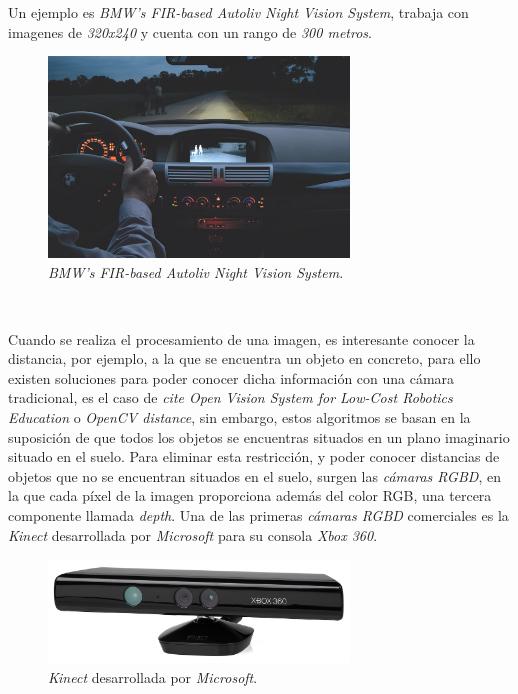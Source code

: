 Un ejemplo es \textit{BMW's FIR-based Autoliv Night Vision System}, trabaja con imagenes de \textit{320x240} y cuenta con un rango de \textit{300 metros}.\\

\begin{figure} [h!]
	\begin{center}
		\includegraphics[width=8cm]{figs/night_vision}
	\end{center}
	\caption{\textit{BMW's FIR-based Autoliv Night Vision System}.}
	\label{fig:nightvision}
\end{figure}\

Cuando se realiza el procesamiento de una imagen, es interesante conocer la distancia, por ejemplo, a la que se encuentra un objeto en concreto, para ello existen soluciones para poder conocer dicha información con una cámara tradicional, es el caso de \textit{cite Open Vision System for Low-Cost Robotics Education} o \textit{OpenCV distance}, sin embargo, estos algoritmos se basan en la suposición de que todos los objetos se encuentras situados en un plano imaginario situado en el suelo. Para eliminar esta restricción, y poder conocer distancias de objetos que no se encuentran situados en el suelo, surgen las \textit{cámaras RGBD}, en la que cada píxel de la imagen proporciona además del color RGB, una tercera componente llamada \textit{depth}. Una de las primeras \textit{cámaras RGBD} comerciales es la \textit{Kinect} desarrollada por \textit{Microsoft} para su consola \textit{Xbox 360}.\\

\begin{figure} [h!]
	\begin{center}
		\includegraphics[width=8cm]{figs/kinect}
	\end{center}
	\caption{\textit{Kinect} desarrollada por \textit{Microsoft}.}
	\label{fig:kinect}
\end{figure}\


